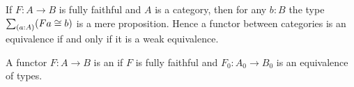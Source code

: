 \documentclass[hott-all.tex]{subfiles}
\begin{document}
\begin{lem}\label{ct:catweq}
  If $F:A\to B$ is fully faithful and $A$ is a category, then for any $b:B$ the type $\sm{a:A} (Fa\cong b)$ is a mere proposition.
  Hence a functor between categories is an equivalence if and only if it is a weak equivalence.
\end{lem}
%

%

\begin{defn}\label{ct:isocat}
  A functor $F:A\to B$ is an 
  if $F$ is fully faithful and $F_0:A_0\to B_0$ is an equivalence of types.
\end{defn}

%
\end{document}
